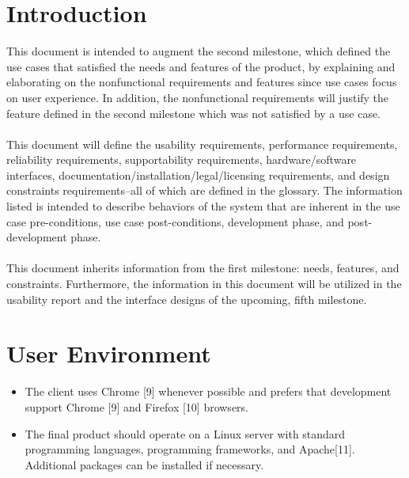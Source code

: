 \documentclass{article}
\begin{document}
\section{Introduction}
This document is intended to augment the second milestone, which defined the use cases that satisfied the needs and features of the product, by explaining and elaborating on the nonfunctional requirements and features since use cases focus on user experience.  In addition, the nonfunctional requirements will justify the feature defined in the second milestone which was not satisfied by a use case.\\
~\\
This document will define the usability requirements, performance requirements, reliability requirements, supportability requirements, hardware/software interfaces, documentation/installation/legal/licensing requirements, and design constraints requirements--all of which are defined in the glossary.  The information listed is intended to describe behaviors of the system that are inherent in the use case pre-conditions, use case post-conditions, development phase, and post-development phase.\\
~\\
This document inherits information from the first milestone:  needs, features, and constraints.  Furthermore, the information in this document will be utilized in the usability report and the interface designs of the upcoming, fifth milestone.

\section{User Environment}
\begin{itemize}
\item The client uses Chrome [9] whenever possible and prefers that development support Chrome [9] and Firefox [10] browsers.
\item The final product should operate on a Linux server with standard programming languages, programming frameworks, and Apache[11].  Additional packages can be installed if necessary.
\end{itemize}
\end{document}
